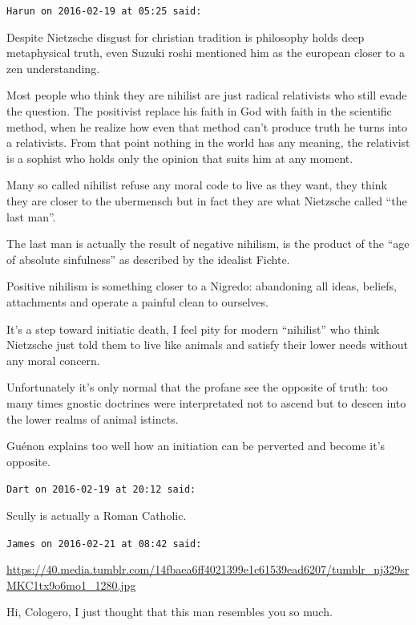 \begin{footnotesize}
\begin{sffamily}
\texttt{Harun on 2016-02-19 at 05:25 said:}

Despite Nietzsche disgust for christian tradition is philosophy holds deep metaphysical truth, even Suzuki roshi mentioned him as the european closer to a zen understanding.

Most people who think they are nihilist are just radical relativists who still evade the question. The positivist replace his faith in God with faith in the scientific method, when he realize how even that method can't produce truth he turns into a relativists. From that point nothing in the world has any meaning, the relativist is a sophist who holds only the opinion that suits him at any moment.

Many so called nihilist refuse any moral code to live as they want, they think they are closer to the ubermensch but in fact they are what Nietzsche called ``the last man''.

The last man is actually the result of negative nihilism, is the product of the ``age of absolute sinfulness'' as described by the idealist Fichte.

Positive nihilism is something closer to a Nigredo: abandoning all ideas, beliefs, attachments and operate a painful clean to ourselves.

It's a step toward initiatic death, I feel pity for modern ``nihilist'' who think Nietzsche just told them to live like animals and satisfy their lower needs without any moral concern.

Unfortunately it's only normal that the profane see the opposite of truth: too many times gnostic doctrines were interpretated not to ascend but to descen into the lower realms of animal istincts.

Guénon explains too well how an initiation can be perverted and become it's opposite.

\hfill

\texttt{Dart on 2016-02-19 at 20:12 said:}

Scully is actually a Roman Catholic.

\hfill

\texttt{James on 2016-02-21 at 08:42 said:}

\url{https://40.media.tumblr.com/14fbaea6ff4021399e1c61539ead6207/tumblr\_nj329srMKC1tx9o6mo1\_1280.jpg}


Hi, Cologero, I just thought that this man resembles you so much.


\end{sffamily}
\end{footnotesize}
